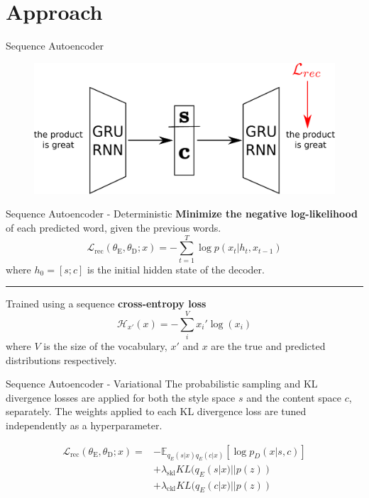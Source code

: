 \documentclass[aspectratio=169]{beamer}
\newcommand{\loss}[1]{\mathcal{L}_{\text{#1}}}
\newcommand{\weight}[1]{\lambda_{\text{#1}}}
\newcommand{\param}[1]{\theta_{\text{#1}}}
\begin{document}
% 

\section{Approach}

\begin{frame}{Sequence Autoencoder}
	\centering
	\begin{figure}[ht]
		\includegraphics[width=\textwidth]{images/overview-training-1}
	\end{figure}
\end{frame}

\begin{frame}{Sequence Autoencoder - Deterministic}
	\textbf{Minimize the negative log-likelihood} of each predicted word, given the previous words.
	\begin{equation*} \label{eqn:dae-rec}
		\loss{rec}(\param{E},\param{D}; x) = - \sum_{t=1}^T \log p(x_t | h_t, x_{t-1})
	\end{equation*}
	where $h_0 = [s; c]$ is the initial hidden state of the decoder.

	\noindent\rule{\textwidth}{0.5pt}

	Trained using a sequence \textbf{cross-entropy loss}
	\begin{equation*}
		\mathcal{H}_{x'} (x) = - \sum_{i}^V x_{i}' \log (x_i)
	\end{equation*}
	where $V$ is the size of the vocabulary, $x'$ and $x$ are the true and predicted distributions respectively.
\end{frame}

\begin{frame}{Sequence Autoencoder - Variational}
	The probabilistic sampling and KL divergence losses are applied for both the style space $s$ and the content space $c$, separately. The weights applied to each KL divergence loss are tuned independently as a hyperparameter.

	\begin{align} \label{eqn:vae-rec}
		\loss{rec}(\param{E},\param{D}; x) =
		 & - \mathbb{E}_{q_{E}(s|x) q_{E}(c|x)} [\log p_D(x|s,c)] \nonumber \\
		 & + \weight{skl} KL(q_{E}(s|x)||p(z))                    \nonumber \\
		 & + \weight{ckl} KL(q_{E}(c|x)||p(z))
	\end{align}
\end{frame}
\end{document}
